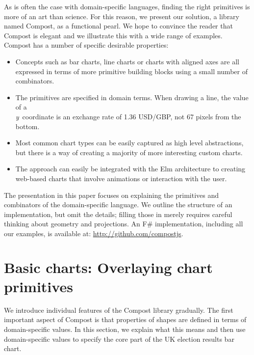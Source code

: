 \documentclass{jfp}
\newcommand{\Y}{\emph{y}\ }
\newcommand{\urrl}[1]{\textnormal{\textcolor{urlclr}{\url{#1}}}}
\begin{document}
As is often the case with domain-specific languages, finding the right primitives is more of an art
than science. For this reason, we present our solution, a library named Compost, as a functional pearl.
We hope to convince the reader that Compost is elegant and we illustrate this with a wide range
of examples. Compost has a number of specific desirable properties:

\begin{itemize}
\item Concepts such as bar charts, line charts or charts with aligned
  axes are all expressed in terms of more primitive building blocks using a small number of combinators.
\item The primitives are specified in domain terms. When drawing a line, the value of a \\ \Y coordinate
  is an exchange rate of 1.36 USD/GBP, not 67 pixels from the bottom.
\item Most common chart types can be easily captured as high level abstractions, but there is a
  way of creating a majority of more interesting custom charts.
\item The approach can easily be integrated with the Elm architecture \cite{elm}
	to creating web-based charts that involve animations or interaction with the user.
\end{itemize}
%
The presentation in this paper focuses on explaining the primitives and combinators of the
domain-specific language. We outline the structure of an implementation, but omit the details; filling
those in merely requires careful thinking about geometry and projections. An F\#
implementation, including all our examples, is available
at: \urrl{http://github.com/compostjs}.

\section{Basic charts: Overlaying chart primitives}
We introduce individual features of the Compost library gradually. The first important aspect of
Compost is that properties of shapes are defined in terms of domain-specific values. In this
section, we explain what this means and then use domain-specific values to specify the core part of the
UK election results bar chart.
\end{document}
